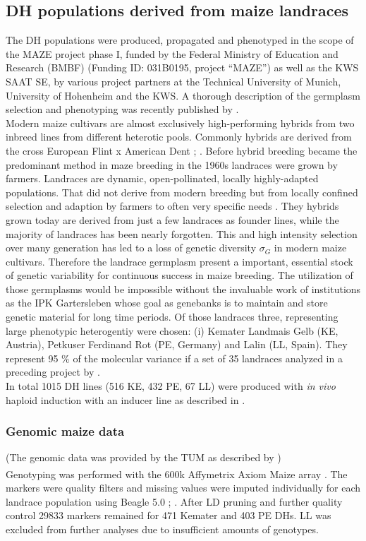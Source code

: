 \subsection{DH populations derived from maize landraces}
The DH populations were produced, propagated and phenotyped in the scope of the MAZE project phase I, funded
by the Federal Ministry of Education and Research (BMBF) (Funding ID: 031B0195, project “MAZE”) as well as the
KWS SAAT SE, by various project partners at the Technical University of Munich, University of Hohenheim and
the KWS. A thorough description of the germplasm selection and phenotyping was recently published by
\cite{holker2019european}. \\ Modern maize cultivars are almost exclusively high-performing hybrids from
two inbreed lines from different heterotic pools. Commonly hybrids are derived from the cross European Flint x
American Dent \cite{dos2004priori}; \cite{brauner2019testcross}. Before hybrid breeding became the predominant
method in maze breeding in the 1960s landraces were grown by farmers. Landraces are dynamic, open-pollinated,
locally highly-adapted populations. That did not derive from modern breeding but from locally confined
selection and adaption by farmers to often very specific needs \cite{arteaga2016genomic}. They hybrids grown
today are derived from just a few landraces as founder lines, while the majority of landraces has been nearly
forgotten. This and high intensity selection over many generation has led to a loss of genetic diversity
$\sigma_G$ in modern maize cultivars. Therefore the landrace germplasm present a important, essential stock of
genetic variability for continuous success in maize breeding. The utilization of those germplasms would be
impossible without the invaluable work of institutions as the IPK Gartersleben whose goal as genebanks is to
maintain and store genetic material for long time periods. Of those landraces three, representing large
phenotypic heterogentiy were chosen: (i) Kemater Landmais Gelb (KE, Austria), Petkuser Ferdinand Rot (PE,
Germany) and Lalin (LL, Spain). They represent 95 \% of the molecular variance if a set of
35 landraces analyzed in a preceding project by \cite{mayer2017there}.\\
In total 1015 DH lines (516 KE, 432 PE, 67 LL) were produced with \textit{in vivo} haploid induction with an inducer line as described in \cite{roeber2005vivo}.


\subsubsection{Genomic maize data}
(The genomic data was provided by the TUM as described by \cite{holker2019european}) \\ Genotyping was
performed with the 600k Affymetrix\textsuperscript{\textregistered} Axiom\textsuperscript{\textregistered}
Maize array \cite{unterseer2014powerful}. The markers were quality filters and missing values were imputed
individually for each landrace population using Beagle 5.0 \cite{browning2007rapid};
\cite{browning2018one}. After LD pruning and further quality control 29833 markers remained for 471 Kemater
and 403 PE DHs. LL was excluded from further analyses due to insufficient amounts of genotypes.

